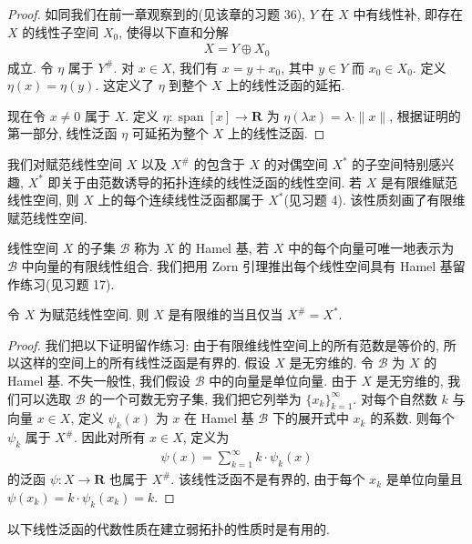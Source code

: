 \documentclass[../../main.tex]{subfiles}
\begin{document}
\begin{proof}
如同我们在前一章观察到的(见该章的习题 36), $Y$ 在 $X$ 中有线性补, 即存在 $X$ 的线性子空间 $X_{0}$, 使得以下直和分解
\begin{align*}
X=Y\oplus X_{0}
\end{align*}
成立. 令 $\eta$ 属于 $Y^{\#}$. 对 $x\in X$, 我们有 $x=y+x_{0}$, 其中 $y\in Y$ 而 $x_{0}\in X_{0}$. 定义 $\eta(x)=\eta(y)$. 这定义了 $\eta$ 到整个 $X$ 上的线性泛函的延拓.

现在令 $x\neq 0$ 属于 $X$. 定义 $\eta:\operatorname{span}[x]\to\mathbf{R}$ 为 $\eta(\lambda x)=\lambda\cdot\|x\|$, 根据证明的第一部分, 线性泛函 $\eta$ 可延拓为整个 $X$ 上的线性泛函.
\end{proof}

我们对赋范线性空间 $X$ 以及 $X^{\#}$ 的包含于 $X$ 的对偶空间 $X^{*}$ 的子空间特别感兴趣, $X^{*}$ 即关于由范数诱导的拓扑连续的线性泛函的线性空间. 若 $X$ 是有限维赋范线性空间, 则 $X$ 上的每个连续线性泛函都属于 $X^{*}$(见习题 4). 该性质刻画了有限维赋范线性空间.

线性空间 $X$ 的子集 $\mathcal{B}$ 称为 $X$ 的 Hamel 基, 若 $X$ 中的每个向量可唯一地表示为 $\mathcal{B}$ 中向量的有限线性组合. 我们把用 Zorn 引理推出每个线性空间具有 Hamel 基留作练习(见习题 17).

\begin{proposition}\label{proposition:ch14-有限维X星}
令 $X$ 为赋范线性空间. 则 $X$ 是有限维的当且仅当 $X^{\#}=X^{*}$.
\end{proposition}

\begin{proof}
我们把以下证明留作练习: 由于有限维线性空间上的所有范数是等价的, 所以这样的空间上的所有线性泛函是有界的. 假设 $X$ 是无穷维的. 令 $\mathcal{B}$ 为 $X$ 的 Hamel 基. 不失一般性, 我们假设 $\mathcal{B}$ 中的向量是单位向量. 由于 $X$ 是无穷维的, 我们可以选取 $\mathcal{B}$ 的一个可数无穷子集, 我们把它列举为 $\{x_{k}\}_{k=1}^{\infty}$. 对每个自然数 $k$ 与向量 $x\in X$, 定义 $\psi_{k}(x)$ 为 $x$ 在 Hamel 基 $\mathcal{B}$ 下的展开式中 $x_{k}$ 的系数. 则每个 $\psi_{k}$ 属于 $X^{\#}$. 因此对所有 $x\in X$, 定义为
\begin{align*}
\psi(x)=\sum_{k=1}^{\infty}k\cdot\psi_{k}(x)
\end{align*}
的泛函 $\psi:X\to\mathbf{R}$ 也属于 $X^{\#}$. 该线性泛函不是有界的, 由于每个 $x_{k}$ 是单位向量且 $\psi(x_{k})=k\cdot\psi_{k}(x_{k})=k$.
\end{proof}

以下线性泛函的代数性质在建立弱拓扑的性质时是有用的.
\end{document}
